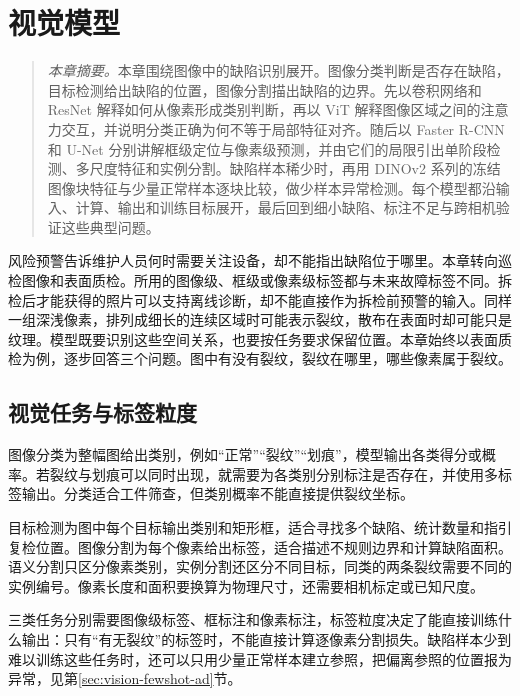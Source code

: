 \chapter{视觉模型}
\begin{quote}\small
\textit{本章摘要。}本章围绕图像中的缺陷识别展开。图像分类判断是否存在缺陷，目标检测给出缺陷的位置，图像分割描出缺陷的边界。先以卷积网络和 ResNet 解释如何从像素形成类别判断，再以 ViT 解释图像区域之间的注意力交互，并说明分类正确为何不等于局部特征对齐。随后以 Faster R-CNN 和 U-Net 分别讲解框级定位与像素级预测，并由它们的局限引出单阶段检测、多尺度特征和实例分割。缺陷样本稀少时，再用 DINOv2 系列的冻结图像块特征与少量正常样本逐块比较，做少样本异常检测。每个模型都沿输入、计算、输出和训练目标展开，最后回到细小缺陷、标注不足与跨相机验证这些典型问题。
\end{quote}
风险预警告诉维护人员何时需要关注设备，却不能指出缺陷位于哪里。本章转向巡检图像和表面质检。所用的图像级、框级或像素级标签都与未来故障标签不同。拆检后才能获得的照片可以支持离线诊断，却不能直接作为拆检前预警的输入。同样一组深浅像素，排列成细长的连续区域时可能表示裂纹，散布在表面时却可能只是纹理。模型既要识别这些空间关系，也要按任务要求保留位置。本章始终以表面质检为例，逐步回答三个问题。图中有没有裂纹，裂纹在哪里，哪些像素属于裂纹。

\section{视觉任务与标签粒度}
图像分类为整幅图给出类别，例如“正常”“裂纹”“划痕”，模型输出各类得分或概率。若裂纹与划痕可以同时出现，就需要为各类别分别标注是否存在，并使用多标签输出。分类适合工件筛查，但类别概率不能直接提供裂纹坐标。

目标检测为图中每个目标输出类别和矩形框，适合寻找多个缺陷、统计数量和指引复检位置。图像分割为每个像素给出标签，适合描述不规则边界和计算缺陷面积。语义分割只区分像素类别，实例分割还区分不同目标，同类的两条裂纹需要不同的实例编号。像素长度和面积要换算为物理尺寸，还需要相机标定或已知尺度。

三类任务分别需要图像级标签、框标注和像素标注，标签粒度决定了能直接训练什么输出：只有“有无裂纹”的标签时，不能直接计算逐像素分割损失。缺陷样本少到难以训练这些任务时，还可以只用少量正常样本建立参照，把偏离参照的位置报为异常，见第\ref{sec:vision-fewshot-ad}节。

